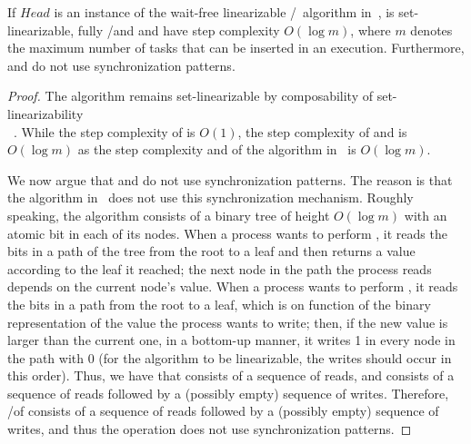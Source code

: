\begin{theorem}\label{theo-wf-log}
If $Head$ is an instance of the wait-free linearizable \R/\W\ \MaxReg algorithm in~\cite{DBLP_journals_jacm_AspnesAC12}, \WFWSM is set-linearizable, fully \R/\W and \Take and \Steal have step complexity $O(\log m)$, where $m$ denotes the maximum number of tasks that can be inserted in an execution. Furthermore, \Take and \Steal do not use \RAW synchronization patterns.
\end{theorem}

\begin{proof}
The algorithm remains set-linearizable by composability of set-linearizability\\~\cite{DBLP_journals_jacm_CastanedaRR18}.  While the step complexity of \Put is $O(1)$, the step complexity of \Take and \Steal is $O(\log m)$ as the step complexity \MaxR and \MaxW of the \MaxReg algorithm in~\cite{DBLP_journals_jacm_AspnesAC12} is $O(\log m)$.

We now argue that \Take and \Steal do not use \RAW synchronization patterns.  The reason is that the \MaxReg algorithm in~\cite{DBLP_journals_jacm_AspnesAC12} does not use this synchronization mechanism.  Roughly speaking, the algorithm consists of a binary tree of height $O(\log m)$ with an atomic bit in each of its nodes.  When a process wants to perform \MaxR, it reads the bits in a path of the tree from the root to a leaf and then returns a value according to the leaf it reached; the next node in the path the process reads depends on the current node's value.  When a process wants to perform \MaxW, it reads the bits in a path from the root to a leaf, which is on function of the binary representation of the value the process wants to write; then, if the new value is larger than the current one, in a bottom-up manner, it writes 1 in every node in the path with 0 (for the algorithm to be linearizable, the writes should occur in this order).  Thus, we have that \MaxR consists of a sequence of reads, and \MaxW consists of a sequence of reads followed by a (possibly empty) sequence of writes.  Therefore, \Take/\Steal of \WFWSM consists of a sequence of reads followed by a (possibly empty) sequence of writes, and thus the operation does not use \RAW synchronization patterns.
\end{proof}